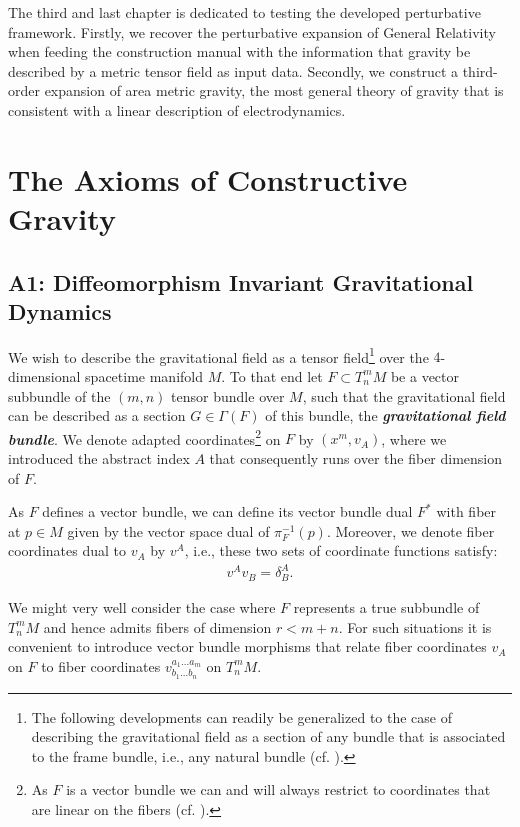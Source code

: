 \documentclass[%
 reprint,
nofootinbib,
 amsmath,amssymb,
 aps,
 prd,
floatfix,
]{revtex4-2}
\begin{document}
The third and last chapter is dedicated to testing the developed perturbative framework. Firstly, we recover the perturbative expansion of General Relativity when feeding the construction manual with the information that gravity be described by a metric tensor field as input data.
Secondly, we construct a third-order expansion of area metric gravity, the most general theory of gravity that is consistent with a linear description of electrodynamics.

\section{The Axioms of Constructive Gravity}\label{chapter1}
\subsection{A1: Diffeomorphism Invariant Gravitational Dynamics }

We wish to describe the gravitational field as a tensor field\footnote{The following developments can readily be generalized to the case of describing the gravitational field as a section of any bundle that is associated to the frame bundle, i.e., any natural bundle (cf. \cite{kolar1993natural}).} over the $4$-dimensional spacetime manifold $M$. To that end let $F \subset T^m_nM$ be a vector subbundle of the $(m,n)$ tensor bundle over $M$, such that the gravitational field can be described as a section $G \in \Gamma(F)$ of this bundle, the \textit{\textbf{gravitational field bundle}}. 
We denote adapted coordinates\footnote{As $F$ is a vector bundle we can and will always restrict to coordinates that are linear on the fibers (cf. \cite{saunders_1989}).} on $F$ by $(x^m,v_A)$, where we introduced the abstract index $A$ that consequently runs over the fiber dimension of $F$.

As $F$ defines a vector bundle, we can define its vector bundle dual $F^{\ast}$ with fiber at $p\in M$ given by the vector space dual of $\pi_F^{-1}(p)$.
Moreover, we denote fiber coordinates dual to $v_A$ by $v^A$, i.e., these two sets of coordinate functions satisfy:
\begin{align}
    v^Av_B = \delta^A_B.
\end{align}

We might very well consider the case where $F$ represents a true subbundle of $T^m_nM$ and hence admits fibers of dimension $r < m+n$. For such situations it is convenient to introduce vector bundle morphisms that relate fiber coordinates $v_A$ on $F$ to fiber coordinates $v^{a_1 ... a_m}_{b_1 ... b_n}$ on $T^m_nM$.
\end{document}
